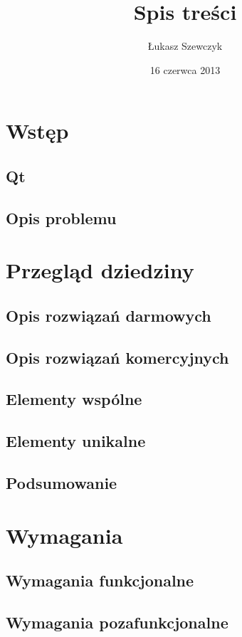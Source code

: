 \documentclass[11pt,oneside,a4paper,final]{llncs}
\begin{document}
\date{16 czerwca 2013}
\title{Spis treści}

\author{Łukasz Szewczyk}

\maketitle

\section{Wstęp}
\subsection{Qt}
\subsection{Opis problemu}


\section{Przegląd dziedziny}
\subsection{Opis rozwiązań darmowych}
\subsection{Opis rozwiązań komercyjnych}
\subsection{Elementy wspólne}
\subsection{Elementy unikalne}
\subsection{Podsumowanie\newline}

\section{Wymagania}
\subsection{Wymagania funkcjonalne}
\subsection{Wymagania pozafunkcjonalne}
\end{document}
